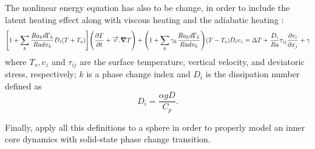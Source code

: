 \documentclass{article}
\begin{document}
The nonlinear energy equation has also to be change, in order to include the latent heating effect along with viscous heating and the adiabatic heating :
\begin{equation}
\Bigg[1 + \sum\limits_{k} \frac{Ra_k d \Gamma_k}{Ra d \pi_k} D_i (T + T_s) \Bigg] \Bigg(\frac{\partial T}{\partial t} + \overrightarrow{v} . \grad T \Bigg) + \Bigg(1 +  \sum\limits_{k}  \gamma_k  \frac{Ra_k d \Gamma_k}{Ra d \pi_k} \Bigg) (T - T_s) D_i v_z = \Delta T + \frac{D_i}{Ra} \tau_{ij} \frac{\partial v_i}{\partial x_j} + \gamma
\end{equation}
where $T_s, v_z$ and $\tau_{ij}$ are the surface temperature, vertical velocity, and deviatoric stress, respectively; $k$ is a phase change index and $D_i$ is the dissipation number defined as 
\begin{equation}
D_i = \frac{\alpha g D}{C_p}.
\end{equation}

Finally, apply all this definitions to a sphere in order to properly model an inner core dynamics with solid-state phase change transition.
\end{document}
